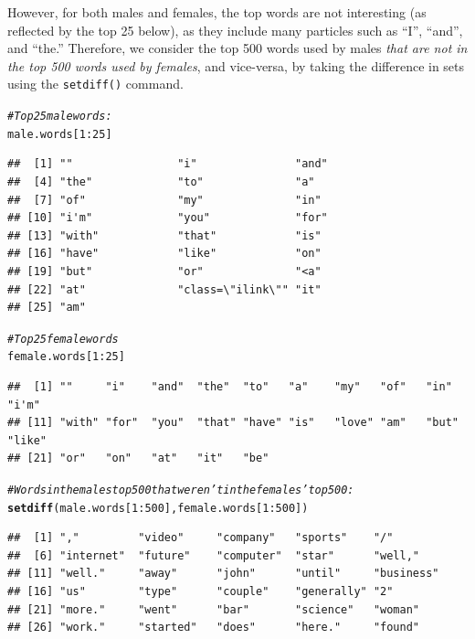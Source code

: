 \documentclass{article}\usepackage[]{graphicx}\usepackage[]{color}
\makeatletter
\newcommand{\hlnum}[1]{\textcolor[rgb]{0.686,0.059,0.569}{#1}}%
\newcommand{\hlcom}[1]{\textcolor[rgb]{0.678,0.584,0.686}{\textit{#1}}}%
\newcommand{\hlopt}[1]{\textcolor[rgb]{0,0,0}{#1}}%
\newcommand{\hlstd}[1]{\textcolor[rgb]{0.345,0.345,0.345}{#1}}%
\newcommand{\hlkwd}[1]{\textcolor[rgb]{0.737,0.353,0.396}{\textbf{#1}}}%
\newenvironment{kframe}{%
 \def\at@end@of@kframe{}%
 \ifinner\ifhmode%
  \def\at@end@of@kframe{\end{minipage}}%
  \begin{minipage}{\columnwidth}%
 \fi\fi%
 \def\FrameCommand##1{\hskip\@totalleftmargin \hskip-\fboxsep
 \colorbox{shadecolor}{##1}\hskip-\fboxsep
     \hskip-\linewidth \hskip-\@totalleftmargin \hskip\columnwidth}%
 \MakeFramed {\advance\hsize-\width
   \@totalleftmargin\z@ \linewidth\hsize
   \@setminipage}}%
 {\par\unskip\endMakeFramed%
 \at@end@of@kframe}
\newenvironment{knitrout}{}{} %
\makeatother
\begin{document}
However, for both males and females, the top words are not interesting (as reflected by the top 25 below), as they include many particles such as ``I'', ``and'', and ``the.''  Therefore, we consider the top 500 words used by males \textit{that are not in the top 500 words used by females}, and vice-versa, by taking the difference in sets using the \verb#setdiff()# command.
\begin{knitrout}
\color{fgcolor}\begin{kframe}
\begin{alltt}
\hlcom{# Top 25 male words:}
\hlstd{male.words[}\hlnum{1}\hlopt{:}\hlnum{25}\hlstd{]}
\end{alltt}
\begin{verbatim}
##  [1] ""                "i"               "and"            
##  [4] "the"             "to"              "a"              
##  [7] "of"              "my"              "in"             
## [10] "i'm"             "you"             "for"            
## [13] "with"            "that"            "is"             
## [16] "have"            "like"            "on"             
## [19] "but"             "or"              "<a"             
## [22] "at"              "class=\"ilink\"" "it"             
## [25] "am"
\end{verbatim}
\begin{alltt}
\hlcom{# Top 25 female words}
\hlstd{female.words[}\hlnum{1}\hlopt{:}\hlnum{25}\hlstd{]}
\end{alltt}
\begin{verbatim}
##  [1] ""     "i"    "and"  "the"  "to"   "a"    "my"   "of"   "in"   "i'm" 
## [11] "with" "for"  "you"  "that" "have" "is"   "love" "am"   "but"  "like"
## [21] "or"   "on"   "at"   "it"   "be"
\end{verbatim}
\begin{alltt}
\hlcom{# Words in the males top 500 that weren't in the females' top 500:}
\hlkwd{setdiff}\hlstd{(male.words[}\hlnum{1}\hlopt{:}\hlnum{500}\hlstd{], female.words[}\hlnum{1}\hlopt{:}\hlnum{500}\hlstd{])}
\end{alltt}
\begin{verbatim}
##  [1] ","         "video"     "company"   "sports"    "/"        
##  [6] "internet"  "future"    "computer"  "star"      "well,"    
## [11] "well."     "away"      "john"      "until"     "business" 
## [16] "us"        "type"      "couple"    "generally" "2"        
## [21] "more."     "went"      "bar"       "science"   "woman"    
## [26] "work."     "started"   "does"      "here."     "found"    

\end{verbatim}
\end{kframe}
\end{knitrout}
\end{document}
